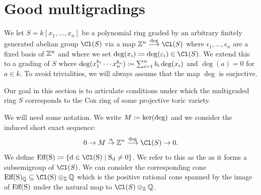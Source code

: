 \documentclass{amsart}
\begin{document}
\fi

\section{Good multigradings}\label{sec:good-gradings}

We let $S=k[x_1, \dots, x_n]$ be a polynomial ring graded by an arbitrary finitely generated abelian group $\Cl(S)$ via a map $\ZZ^n\overset{\deg}{\longrightarrow}\Cl(S)$ where $\epsilon_1, \dots, \epsilon_n$ are a fixed basis of $\mathbb Z^n$ and where we set $\deg(x_i) \ce\deg(\epsilon_i)\in \Cl(S)$.  We extend this to a grading of $S$ where $\deg(x_1^{b_1}\cdots x_n^{b_n})\coloneqq \sum_{i=1}^n b_i\deg(x_i)$ and $\deg(a)=0$ for $a\in k$.  To avoid trivialities, we will always assume that the map $\deg$ is surjective.

Our goal in this section is to articulate conditions under which the multigraded ring $S$ corresponds to the Cox ring of some projective toric variety.

We will need some notation.  We write $M\coloneqq\ker(\deg)$ and we consider the induced short exact sequence:
\[
0\to M\overset{\alpha}{\to} \ZZ^n \overset{\deg}{\longrightarrow} \Cl(S) \to 0.
\]
We define $\Eff(S) \ce\{d \in \Cl(S) \mid S_d \ne 0\}$.  We refer to this as the  as it forms a subsemigroup of $\Cl(S)$.  We can consider the corresponding cone $\Eff(S)_{\QQ}\subseteq \Cl(S)\otimes_{\ZZ}\QQ$ which is the positive rational cone spanned by the image of $\rm Eff(S)$ under the natural map to $\Cl(S)\otimes_{\ZZ}\QQ$.
\end{document}
